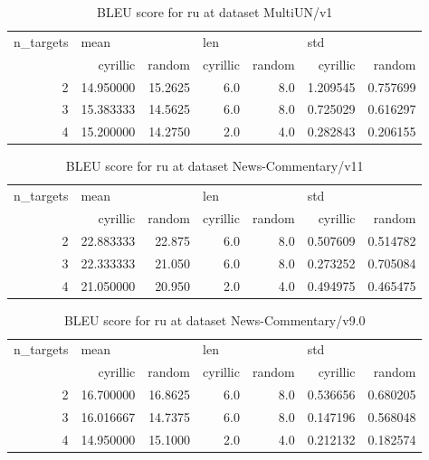 \begin{table}[h]
\begin{tabular}{rrrrrrr}
\toprule
n\_targets & \multicolumn{2}{l}{mean} & \multicolumn{2}{l}{len} & \multicolumn{2}{l}{std} \\
          &   cyrillic &   random & cyrillic & random &  cyrillic &    random \\
\midrule
        2 &  14.950000 &  15.2625 &      6.0 &    8.0 &  1.209545 &  0.757699 \\
        3 &  15.383333 &  14.5625 &      6.0 &    8.0 &  0.725029 &  0.616297 \\
        4 &  15.200000 &  14.2750 &      2.0 &    4.0 &  0.282843 &  0.206155 \\
\bottomrule
\end{tabular}

\caption{BLEU score for  ru at dataset MultiUN/v1 }
\label{ table:ru/MultiUN/v1 }
\end{table}

\begin{table}[h]
\begin{tabular}{rrrrrrr}
\toprule
n\_targets & \multicolumn{2}{l}{mean} & \multicolumn{2}{l}{len} & \multicolumn{2}{l}{std} \\
          &   cyrillic &  random & cyrillic & random &  cyrillic &    random \\
\midrule
        2 &  22.883333 &  22.875 &      6.0 &    8.0 &  0.507609 &  0.514782 \\
        3 &  22.333333 &  21.050 &      6.0 &    8.0 &  0.273252 &  0.705084 \\
        4 &  21.050000 &  20.950 &      2.0 &    4.0 &  0.494975 &  0.465475 \\
\bottomrule
\end{tabular}

\caption{BLEU score for  ru at dataset News-Commentary/v11 }
\label{ table:ru/News-Commentary/v11 }
\end{table}

\begin{table}[h]
\begin{tabular}{rrrrrrr}
\toprule
n\_targets & \multicolumn{2}{l}{mean} & \multicolumn{2}{l}{len} & \multicolumn{2}{l}{std} \\
          &   cyrillic &   random & cyrillic & random &  cyrillic &    random \\
\midrule
        2 &  16.700000 &  16.8625 &      6.0 &    8.0 &  0.536656 &  0.680205 \\
        3 &  16.016667 &  14.7375 &      6.0 &    8.0 &  0.147196 &  0.568048 \\
        4 &  14.950000 &  15.1000 &      2.0 &    4.0 &  0.212132 &  0.182574 \\
\bottomrule
\end{tabular}

\caption{BLEU score for  ru at dataset News-Commentary/v9.0 }
\label{ table:ru/News-Commentary/v9.0 }
\end{table}

